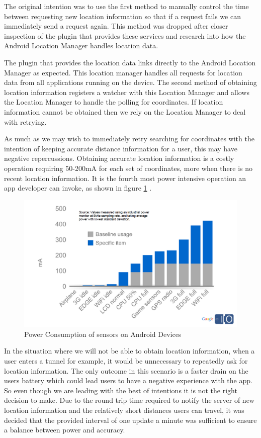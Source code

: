 The original intention was to use the first method to manually control
the time between requesting new location information so that if a
request fails we can immediately send a request again. This method was
dropped after closer inspection of the plugin that provides these
services and research into how the Android Location Manager handles
location data.

The plugin that provides the location data links directly to the
Android Location Manager as expected. This location manager handles
all requests for location data from all applications running on the
device. The second method of obtaining location information registers
a watcher with this Location Manager and allows the Location Manager
to handle the polling for coordinates. If location information cannot
be obtained then we rely on the Location Manager to deal with
retrying. 

As much as we may wish to immediately retry searching for coordinates
with the intention of keeping accurate distance information for a
user, this may have negative repercussions. Obtaining accurate
location information is a costly operation requiring 50-200mA for each set
of coordinates, more when there is no recent location
information\cite{android_power}. It is the fourth most power intensive
operation an app developer can invoke, as shown in figure
\ref{fig:power} \cite{android_efficiencySlides}.

\begin{figure}[h]
  \centering
  \includegraphics[width=\textwidth]{images/power.png}
  \caption{Power Consumption of sensors on Android Devices \cite{android_efficiencySlides}}
  \label{fig:power}
\end{figure}

In the situation where we will not be able to obtain location
information, when a user enters a tunnel for example, it would be
unnecessary to repeatedly ask for location information. The only
outcome in this scenario is a faster drain on the users battery which
could lead users to have a negative experience with the app. So even
though we are leading with the best of intentions it is not the right
decision to make. Due to the round trip time required to notify the
server of new location information and the relatively short distances
users can travel, it was decided that the provided interval of one
update a minute was sufficient to ensure a balance between power and
accuracy. 

